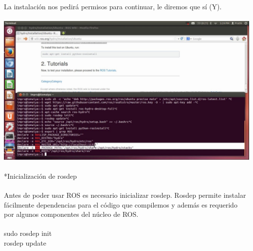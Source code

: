 \documentclass[12pt,a4paper]{article}
\begin{document}
La instalación nos pedirá permisos para continuar, le diremos que sí (Y).
\\\\
\includegraphics[scale=0.3]{maxresdefault.jpg} 
\\\\
*Inicialización de rosdep
\\\\
Antes de poder usar ROS es necesario inicializar rosdep. Rosdep permite instalar fácilmente dependencias para el código que compilemos y además es requerido por algunos componentes del núcleo de ROS.
\\\\
sudo rosdep init \\
rosdep update
\\\\
\end{document}
